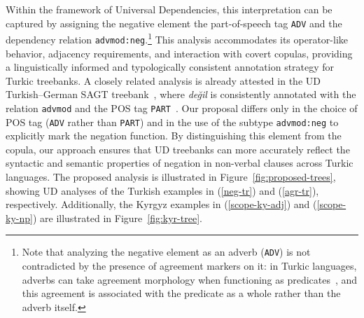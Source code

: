 \documentclass[10pt, a4paper]{article}
\newcommand{\upos}[1]{\texttt{#1}}
\newcommand{\rel}[1]{\texttt{#1}}
\begin{document}
Within the framework of Universal Dependencies, this interpretation can be captured by assigning the negative element the part-of-speech tag \upos{ADV} and the dependency relation \rel{advmod:neg}.\footnote{Note that analyzing the negative element as an adverb (\upos{ADV}) is not contradicted by the presence of agreement markers on it: in Turkic languages, adverbs can take agreement morphology when functioning as predicates~\citep{kornfilt2013}, and this agreement is associated with the predicate as a whole rather than the adverb itself.}
This analysis accommodates its operator-like behavior, adjacency requirements, and interaction with covert copulas, providing a linguistically informed and typologically consistent annotation strategy for Turkic treebanks.
A closely related analysis is already attested in the UD Turkish--German SAGT treebank~\citep{cetinoglu_two_2023}, where \emph{değil} is consistently annotated with the relation \rel{advmod} and the POS tag \upos{PART}~.
Our proposal differs only in the choice of POS tag (\upos{ADV} rather than \upos{PART}) and in the use of the subtype \rel{advmod:neg} to explicitly mark the negation function.
By distinguishing this element from the copula, our approach ensures that UD treebanks can more accurately reflect the syntactic and semantic properties of negation in non-verbal clauses across Turkic languages.
The proposed analysis is illustrated in Figure~\ref{fig:proposed-trees}, showing UD analyses of the Turkish examples in (\ref{neg-tr}) and (\ref{agr-tr}), respectively.
Additionally, the Kyrgyz examples in (\ref{scope-ky-adj}) and (\ref{scope-ky-np}) are illustrated in Figure~\ref{fig:kyr-tree}.
\end{document}
